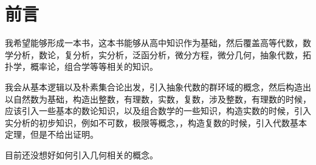 
\chapter*{前言}
我希望能够形成一本书，这本书能够从高中知识作为基础，然后覆盖高等代数，数学分析，数论，复分析，实分析，泛函分析，微分方程，微分几何，抽象代数，拓扑学，概率论，组合学等等相关的知识。

我会从基本逻辑以及朴素集合论出发，引入抽象代数的群环域的概念，然后构造出以自然数为基础，构造出整数，有理数，实数，复数，涉及整数，有理数的时候，应该引入一些基本的数论知识，以及组合数学的一些知识，构造实数的时候，引入实分析的初步知识，例如不可数，极限等概念，，构造复数的时候，引入代数基本定理，但是不给出证明。

目前还没想好如何引入几何相关的概念。

